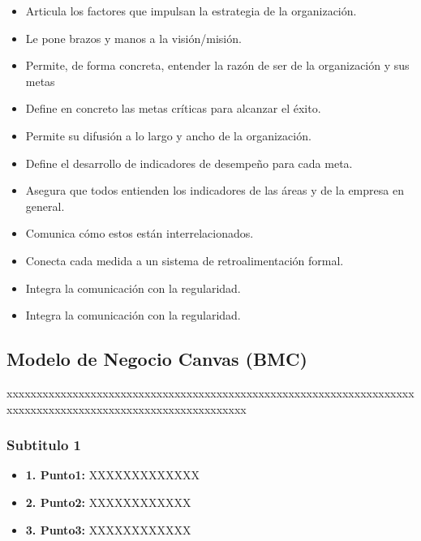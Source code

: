 \documentclass[preprint,12pt]{elsarticle}
\begin{document}
	\begin{itemize}
	\item Articula los factores que impulsan la estrategia de la organización.
	\item Le pone brazos y manos a la visión/misión.

	\item Permite, de forma concreta, entender la razón de ser de la organización y sus metas
	\item Define en concreto las metas críticas para alcanzar el éxito.

	\item Permite su difusión a lo largo y ancho de la organización.
	\item Define el desarrollo de indicadores de desempeño para cada meta.

	\item Asegura que todos entienden los indicadores de las áreas y de la empresa en general.
	\item Comunica cómo estos están interrelacionados.

	\item Conecta cada medida a un sistema de retroalimentación formal.
	\item Integra la comunicación con la regularidad.

	\item Integra la comunicación con la regularidad.
	\end{itemize}


	\subsection{\textbf{Modelo de Negocio Canvas (BMC) }}
	
xxxxxxxxxxxxxxxxxxxxxxxxxxxxxxxxxxxxxxxxxxxxxxxxxxxxxxxxxxxxxxxxxxxxxxxxxxxxxxxxxxxxxxxxxxxxxxxxxxxxxxxxxxxx

	\subsubsection{\textbf{Subtitulo 1}}
	\begin{itemize}
	\item{\textbf{1. Punto1: }}XXXXXXXXXXXXX
	\item {\textbf{2. Punto2: }}XXXXXXXXXXXX
	\item {\textbf{3. Punto3: }}XXXXXXXXXXXX
	\end{itemize}
\end{document}

